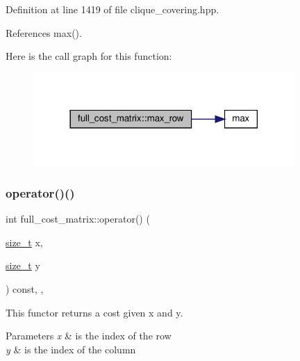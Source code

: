 Definition at line 1419 of file clique\+\_\+covering.\+hpp.



References max().

Here is the call graph for this function\+:
\nopagebreak
\begin{figure}[H]
\begin{center}
\leavevmode
\includegraphics[width=282pt]{de/d5f/structfull__cost__matrix_a742972fc40fef6f6a007f211e18d5034_cgraph}
\end{center}
\end{figure}
\mbox{\label{structfull__cost__matrix_a625adeda249e638a0ea9c702bb34c437}} 
\subsubsection{\texorpdfstring{operator()()}{operator()()}}
{\footnotesize\ttfamily int full\+\_\+cost\+\_\+matrix\+::operator() (\begin{DoxyParamCaption}\item[{\hyperlink{tutorial__fpt__2017_2intro_2sixth_2test_8c_a7c94ea6f8948649f8d181ae55911eeaf}{size\+\_\+t}}]{x,  }\item[{\hyperlink{tutorial__fpt__2017_2intro_2sixth_2test_8c_a7c94ea6f8948649f8d181ae55911eeaf}{size\+\_\+t}}]{y }\end{DoxyParamCaption}) const\hspace{0.3cm}{\ttfamily [inline]}, {\ttfamily [override]}, {\ttfamily [virtual]}}



This functor returns a cost given x and y. 


\begin{DoxyParams}{Parameters}
{\em x} & is the index of the row \\
\hline
{\em y} & is the index of the column \\
\hline
\end{DoxyParams}


